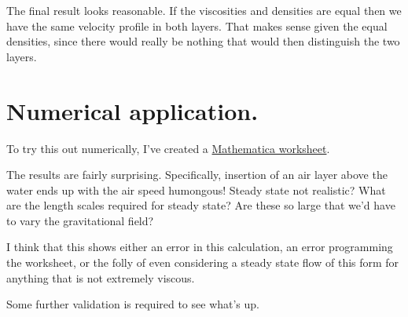 The final result looks reasonable.  If the viscosities and densities are equal then we have the same velocity profile in both layers.  That makes sense given the equal densities, since there would really be nothing that would then distinguish the two layers.

\section{Numerical application.}

To try this out numerically, I've created a \href{https://raw.github.com/peeterjoot/physicsplay/master/notes/phy454/twoLayerInclinedFlowDifferentDensities.cdf}{Mathematica worksheet}.

The results are fairly surprising.  Specifically, insertion of an air layer above the water ends up with the air speed humongous!  Steady state not realistic?  What are the length scales required for steady state?  Are these so large that we'd have to vary the gravitational field?

I think that this shows either an error in this calculation, an error programming the worksheet, or the folly of even considering a steady state flow of this form for anything that is not extremely viscous.

Some further validation is required to see what's up.

\EndArticle
